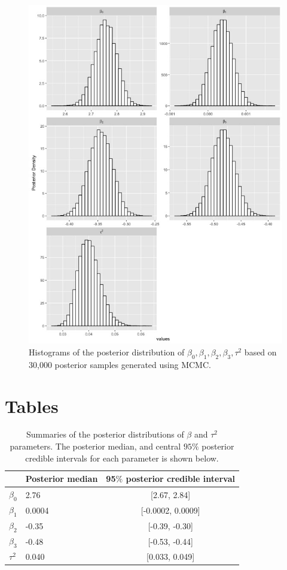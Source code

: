 \documentclass[12pt, a4paper]{article}
\begin{document}
\begin{figure}[H]
\centering
\includegraphics[width=1\linewidth]{projectfig1.jpeg}
\caption{\small Histograms of the posterior distribution of $\beta_{0},\beta_{1}, \beta_{2},\beta_{3}, \tau^{2}$ based on 30,000 posterior samples generated using MCMC.}
\end{figure}



\section{Tables}
\begin{table}[H]
\centering
\caption{\small Summaries of the posterior distributions of $\beta$ and $\tau^{2}$ parameters. The posterior median, and central $95\%$ posterior credible intervals for each parameter is shown below.}
\label{my-label}
\begin{tabu} to \textwidth {Xlc}
\toprule
& Posterior median  & 95$\%$ posterior credible interval \\ \midrule
$\beta_{0}$ & 2.76   & [2.67, 2.84]     \\
$\beta_{1}$ & 0.0004 & [-0.0002, 0.0009]   \\
$\beta_{2}$ & -0.35  & [-0.39, -0.30]    \\
$\beta_{3}$ & -0.48  & [-0.53, -0.44]    \\
$\tau^{2}$  &  0.040     & [0.033, 0.049]       \\ \bottomrule
\end{tabu}
\end{table}
\end{document}
